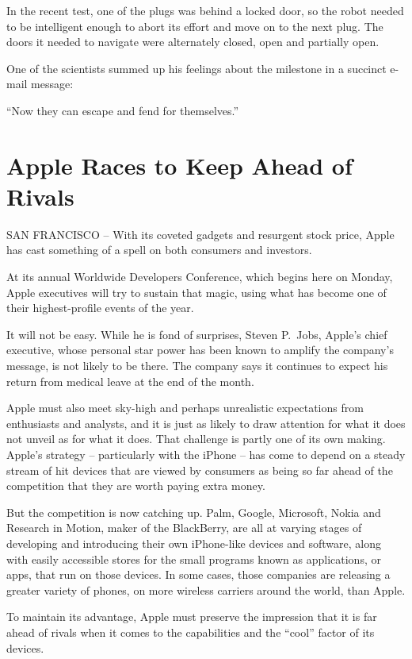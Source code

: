 \documentclass[12pt,a4paper,onecolumn]{article}
\begin{document}
In the recent test, one of the plugs was behind a locked door, so the robot needed to be intelligent
enough to abort its effort and move on to the next plug. The doors it needed to navigate were
alternately closed, open and partially open.

One of the scientists summed up his feelings about the milestone in a succinct e-mail message:

``Now they can escape and fend for themselves.''

\section{Apple Races to Keep Ahead of Rivals}

SAN FRANCISCO -- With its coveted gadgets and resurgent stock price, Apple has cast something of a
spell on both consumers and investors.

At its annual Worldwide Developers Conference, which begins here on Monday, Apple executives will
try to sustain that magic, using what has become one of their highest-profile events of the year.

It will not be easy. While he is fond of surprises, Steven P.~Jobs, Apple's chief executive, whose
personal star power has been known to amplify the company's message, is not likely to be there. The
company says it continues to expect his return from medical leave at the end of the month.

Apple must also meet sky-high and perhaps unrealistic expectations from enthusiasts and analysts,
and it is just as likely to draw attention for what it does not unveil as for what it does. That
challenge is partly one of its own making. Apple's strategy -- particularly with the iPhone -- has
come to depend on a steady stream of hit devices that are viewed by consumers as being so far ahead
of the competition that they are worth paying extra money.

But the competition is now catching up. Palm, Google, Microsoft, Nokia and Research in Motion, maker
of the BlackBerry, are all at varying stages of developing and introducing their own iPhone-like
devices and software, along with easily accessible stores for the small programs known as
applications, or apps, that run on those devices. In some cases, those companies are releasing a
greater variety of phones, on more wireless carriers around the world, than Apple.

To maintain its advantage, Apple must preserve the impression that it is far ahead of rivals when it
comes to the capabilities and the ``cool'' factor of its devices.
\end{document}
